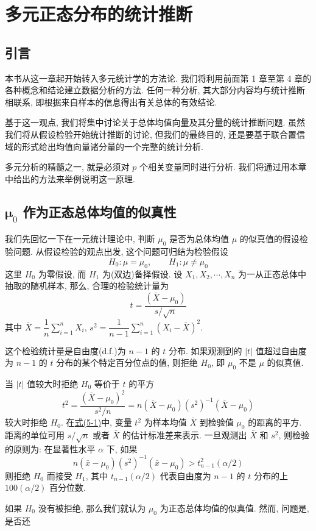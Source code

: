 
\chapter{多元正态分布的统计推断}
\label{chap:5}

\section{引言}
\label{sec:5.1}

本书从这一章起开始转入多元统计学的方法论. 我们将利用前面第 1 章至第 4 章的各种概念和结论建立数据分析的方法. 任何一种分析, 其大部分内容均与统计推断相联系, 即根据来自样本的信息得出有关总体的有效结论.

基于这一观点, 我们将集中讨论关于总体均值向量及其分量的统计推断问题. 虽然我们将从假设检验开始统计推断的讨论, 但我们的最终目的, 还是要基于联合置信域的形式给出均值向量诸分量的一个完整的统计分析.

多元分析的精髓之一, 就是必须对 $p$ 个相关变量同时进行分析. 我们将通过用本章中给出的方法来举例说明这一原理.

\section{\texorpdfstring{$\boldsymbol{\mu}_0$}{mu0} 作为正态总体均值的似真性}
\label{sec:5.2}

我们先回忆一下在一元统计理论中, 判断 $\mu_0$ 是否为总体均值 $\mu$ 的似真值的假设检验问题. 从假设检验的观点出发, 这个问题可归结为检验假设
\[
H_0: \mu = \mu_0, \qquad H_1: \mu \neq \mu_0
\]
这里 $H_0$ 为零假设, 而 $H_1$ 为(双边)备择假设. 设 $X_1, X_2, \cdots, X_n$ 为一从正态总体中抽取的随机样本, 那么, 合理的检验统计量为
\[
t = \frac{(\bar{X} - \mu_0)}{s/\sqrt{n}}
\]
其中 $\bar{X} = \dfrac{1}{n}\sum\limits_{i=1}^{n}X_i$, $s^2 = \dfrac{1}{n-1}\sum\limits_{i=1}^{n}(X_i - \bar{X})^2$.

这个检验统计量是自由度(d.f.)为 $n-1$ 的 $t$ 分布. 如果观测到的 $|t|$ 值超过自由度为 $n-1$ 的 $t$ 分布的某个特定百分位点的值, 则拒绝 $H_0$, 即 $\mu_0$ 不是 $\mu$ 的似真值.

当 $|t|$ 值较大时拒绝 $H_0$ 等价于 $t$ 的平方
\label{eq:5-1}
\begin{equation}
t^2 = \frac{(\bar{X} - \mu_0)^2}{s^2/n} = n(\bar{X} - \mu_0)(s^2)^{-1}(\bar{X} - \mu_0) \tag{5-1}
\end{equation}
较大时拒绝 $H_0$. 在\hyperref[eq:5-1]{式(5-1)}中, 变量 $t^2$ 为样本均值 $\bar{X}$ 到检验值 $\mu_0$ 的距离的平方. 距离的单位可用 $s/\sqrt{n}$ 或者 $\bar{X}$ 的估计标准差来表示. 一旦观测出 $\bar{X}$ 和 $s^2$, 则检验的原则为: 在显著性水平 $\alpha$ 下, 如果
\label{eq:5-2}
\begin{equation}
n(\bar{x} - \mu_0)(s^2)^{-1}(\bar{x} - \mu_0) > t_{n-1}^2(\alpha/2) \tag{5-2}
\end{equation}
则拒绝 $H_0$ 而接受 $H_1$, 其中 $t_{n-1}(\alpha/2)$ 代表自由度为 $n-1$ 的 $t$ 分布的上 $100(\alpha/2)$ 百分位数.

如果 $H_0$ 没有被拒绝, 那么我们就认为 $\mu_0$ 为正态总体均值的似真值. 然而, 问题是, 是否还
